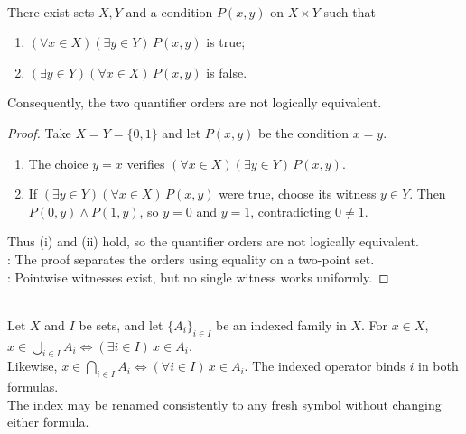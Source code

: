 \begin{proposition} \label{prop:quantifier-order-can-change-truth-value} \\
There exist sets $X,Y$ and a condition $P(x,y)$ on $X\times Y$ such that
\begin{enumerate}[label=(\roman*)]
\setlength{\itemsep}{0pt}
\item $(\forall x\in X)(\exists y\in Y)\,P(x,y)$ is true;
\item $(\exists y\in Y)(\forall x\in X)\,P(x,y)$ is false.
\end{enumerate}
Consequently, the two quantifier orders are not logically equivalent.
\begin{proof} Take $X=Y=\{0,1\}$ and let $P(x,y)$ be the condition $x=y$.
\begin{enumerate}[label=(\roman*)]
\setlength{\itemsep}{0pt}
\item The choice $y=x$ verifies $(\forall x\in X)(\exists y\in Y)\,P(x,y)$.
\item If $(\exists y\in Y)(\forall x\in X)\,P(x,y)$ were true, choose its witness $y\in Y$. Then $P(0,y)\land P(1,y)$, so $y=0$ and $y=1$, contradicting $0\neq1$.
\end{enumerate} Thus (i) and (ii) hold, so the quantifier orders are not logically equivalent.\\
: The proof separates the orders using equality on a two-point set.\\
: Pointwise witnesses exist, but no single witness works uniformly.
\end{proof}
\end{proposition}

\begin{remark} \label{rem:bound-index-variables} \\
Let $X$ and $I$ be sets, and let $\{A_i\}_{i\in I}$ be an indexed family in $X$. For $x\in X$, $x\in\bigcup\limits_{i\in I}A_i\Longleftrightarrow(\exists i\in I)\,x\in A_i$.\\
Likewise, $x\in\bigcap\limits_{i\in I}A_i\Longleftrightarrow(\forall i\in I)\,x\in A_i$. The indexed operator binds $i$ in both formulas.\\
The index may be renamed consistently to any fresh symbol without changing either formula.
\end{remark}
